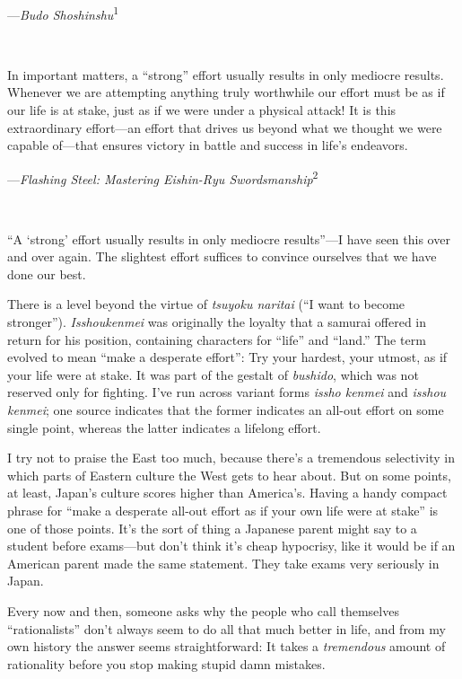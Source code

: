 {\raggedleft
 {}---\textit{Budo Shoshinshu}\textsuperscript{1}
\par}


\bigskip

{
 ~}

{
 In important matters, a
``strong'' effort usually results in
only mediocre results. Whenever we are attempting anything truly
worthwhile our effort must be as if our life is at stake, just as if we
were under a physical attack! It is this extraordinary effort---an
effort that drives us beyond what we thought we were capable of---that
ensures victory in battle and success in life's
endeavors.}

{\raggedleft
 {}---\textit{Flashing Steel: Mastering Eishin-Ryu
Swordsmanship}\textsuperscript{2}
\par}


\bigskip

{
 ~}

{
 ``A `strong'
effort usually results in only mediocre results''---I
have seen this over and over again. The slightest effort suffices to
convince ourselves that we have done our best.}

{
 There is a level beyond the virtue of \textit{tsuyoku naritai}
(``I want to become stronger'').
\textit{Isshoukenmei} was originally the loyalty that a samurai offered
in return for his position, containing characters for
``life'' and
``land.'' The term evolved to mean
``make a desperate effort'': Try
your hardest, your utmost, as if your life were at stake. It was part
of the gestalt of \textit{bushido}, which was not reserved only for
fighting. I've run across variant forms \textit{issho
kenmei} and \textit{isshou kenmei}; one source indicates that the
former indicates an all-out effort on some single point, whereas the
latter indicates a lifelong effort.}

{
 I try not to praise the East too much, because
there's a tremendous selectivity in which parts of
Eastern culture the West gets to hear about. But on some points, at
least, Japan's culture scores higher than
America's. Having a handy compact phrase for
``make a desperate all-out effort as if your own life
were at stake'' is one of those points.
It's the sort of thing a Japanese parent might say to a
student before exams---but don't think
it's cheap hypocrisy, like it would be if an American
parent made the same statement. They take exams very seriously in
Japan.}

{
 Every now and then, someone asks why the people who call
themselves ``rationalists''
don't always seem to do all that much better in life,
and from my own history the answer seems straightforward: It takes a
\textit{tremendous} amount of rationality before you stop making stupid
damn mistakes.}

